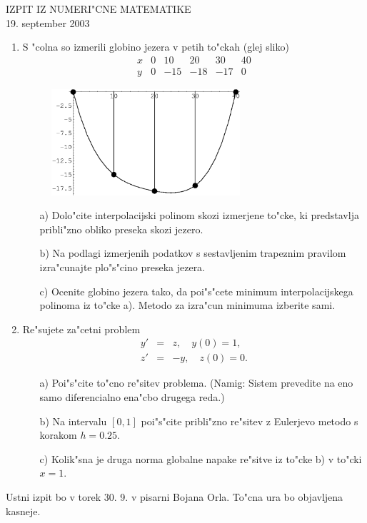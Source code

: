\documentclass[12pt,a4paper]{article}
\begin{document}
\begin{center}
  IZPIT IZ NUMERI"CNE MATEMATIKE\\
  19. september 2003
\end{center}
\vspace{2cm}

\begin{enumerate}
  \item S "colna so izmerili globino jezera v petih to"ckah (glej sliko)
  $$\begin{array}{l|rrrrr}
      x & 0 & 10 & 20 & 30 &40\\ \hline
      y & 0 & -15 & -18 & -17 & 0
     \end{array}
  $$
  \begin{figure}[h]
  \begin{center}
       \includegraphics[width=7cm]{jezero.eps} 
  \end{center}
  \end{figure}
  \begin{itemize}
    \item[a)] Dolo"cite interpolacijski polinom skozi izmerjene to"cke,
    ki predstavlja pribli"zno obliko preseka skozi jezero. 

    \item[b)] Na podlagi izmerjenih podatkov s sestavljenim trapeznim
    pravilom izra"cunajte plo"s"cino preseka jezera.
 
     \item[c)] Ocenite globino jezera tako, da poi"s"cete minimum
     interpolacijskega polinoma iz to"cke a). Metodo za izra"cun
     minimuma izberite sami. 

  \end{itemize}
  
  \item Re"sujete za"cetni problem 
  \begin{eqnarray*}
    y' &=& z,\quad y(0)=1,\\
    z' &=& -y, \quad z(0)=0.
  \end{eqnarray*}
 
   \begin{itemize}
    \item[a)] Poi"s"cite to"cno re"sitev problema. (Namig: Sistem
    prevedite na eno samo diferencialno ena"cbo drugega reda.) 

    \item[b)] Na intervalu $[0,1]$ poi"s"cite pribli"zno re"sitev z 
    Eulerjevo metodo
    s korakom $h=0.25$.

    \item[c)] Kolik"sna je druga norma globalne napake re"sitve iz to"cke b)
    v to"cki $x=1$. 

  \end{itemize}
\end{enumerate}
Ustni izpit bo v torek 30. 9. v pisarni Bojana Orla. To"cna ura bo objavljena 
kasneje.
\end{document}
